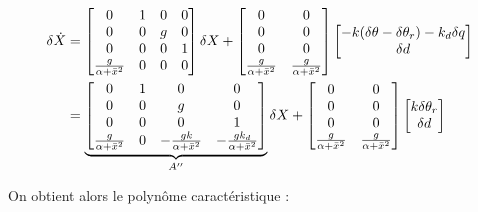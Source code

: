 \documentclass[10pt]{article}
\begin{document}
\begin{align}
\delta \dot X &=
	\begin{bmatrix}
		0 & 1 & 0 & 0 \\
		0 & 0 & g & 0 \\
		0 & 0 & 0 & 1 \\
		\frac{g}{\alpha + \bar x^2} & 0 & 0 & 0
	\end{bmatrix}
	\delta X
	+
	\begin{bmatrix}
		0 & 0 \\
		0 & 0 \\
		0 & 0 \\
		\frac{g}{\alpha + \bar x^2} & \frac{g}{\alpha + \bar x^2}
	\end{bmatrix}
	\begin{bmatrix}
		- k ( \delta \theta - \delta \theta_r ) - k_d \delta q \\ \delta d
	\end{bmatrix}
	\notag \\
	&= \underbrace{
	\begin{bmatrix}
		0 & 1 & 0 & 0 \\
		0 & 0 & g & 0 \\
		0 & 0 & 0 & 1 \\
		\frac{g}{\alpha + \bar x^2} & 0 & - \frac{g k}{\alpha + \bar x^2} & - \frac{g k_d}{\alpha + \bar x^2}
	\end{bmatrix}
	}_{A''}
	\delta X
	+
	\begin{bmatrix}
		0 & 0 \\
		0 & 0 \\
		0 & 0 \\
		\frac{g}{\alpha + \bar x^2} & \frac{g}{\alpha + \bar x^2}
	\end{bmatrix}
	\begin{bmatrix}
		k \delta \theta_r \\ \delta d
	\end{bmatrix}
	\notag
\end{align}

\noindent On obtient alors le polynôme caractéristique :
\end{document}

